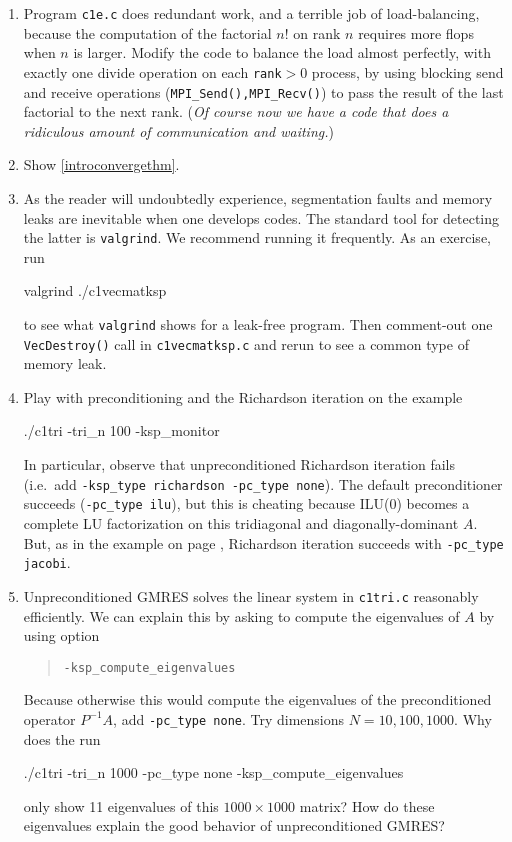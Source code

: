\renewcommand{\labelenumi}{\arabic{chapter}.\arabic{enumi}\quad}
\begin{enumerate}
\item Program \texttt{c1e.c} does redundant work, and a terrible job of load-balancing, because the computation of the factorial $n!$ on rank $n$ requires more flops when $n$ is larger.  Modify the code to balance the load almost perfectly, with exactly one divide operation on each \texttt{rank}$>0$ process, by using blocking send and receive operations (\texttt{MPI\_Send(),MPI\_Recv()}) to pass the result of the last factorial to the next rank.  (\emph{Of course now we have a code that does a ridiculous amount of communication and waiting.})
\item Show \eqref{introconvergethm}.
\item As the reader will undoubtedly experience, segmentation faults and memory leaks are inevitable when one develops \PETSc codes.  The standard tool for detecting the latter is \texttt{valgrind}.  We recommend running it frequently.  As an exercise, run
\begin{cline}
valgrind ./c1vecmatksp
\end{cline}
to see what \texttt{valgrind} shows for a leak-free program.  Then comment-out one \texttt{VecDestroy()} call in \texttt{c1vecmatksp.c} and rerun to see a common type of memory leak.
\item Play with preconditioning and the Richardson iteration on the example
\begin{cline}
./c1tri -tri_n 100 -ksp_monitor
\end{cline}
In particular, observe that unpreconditioned Richardson iteration fails (i.e.~add \texttt{-ksp\_type richardson -pc\_type none}).  The default preconditioner succeeds (\texttt{-pc\_type ilu}), but this is cheating because ILU($0$) becomes a complete LU factorization on this tridiagonal and diagonally-dominant $A$.  But, as in the example on page \pageref{introprerichardson}, Richardson iteration succeeds with \texttt{-pc\_type jacobi}.
\item \label{exer:computeeigs} Unpreconditioned GMRES solves the linear system in \texttt{c1tri.c} reasonably efficiently.  We can explain this by asking \PETSc to compute the eigenvalues of $A$ by using option
\begin{quote}
\texttt{-ksp\_compute\_eigenvalues}
\end{quote}
Because otherwise this would compute the eigenvalues of the preconditioned operator $P^{-1}A$, add \texttt{-pc\_type none}.  Try dimensions $N=10,100,1000$.  Why does the  run
\begin{cline}
./c1tri -tri_n 1000 -pc_type none -ksp_compute_eigenvalues
\end{cline}
only show 11 eigenvalues of this $1000\times 1000$ matrix?  How do these eigenvalues explain the good behavior of unpreconditioned GMRES?
\end{enumerate}